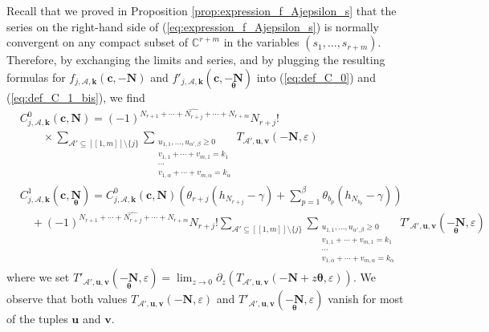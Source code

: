 \documentclass[a4paper]{amsart}
\theoremstyle{remark}
\theoremstyle{definition}
\begin{document}
Recall that we proved in Proposition \ref{prop:expression_f_Ajepsilon_s} that the series on the right-hand side of (\ref{eq:expression_f_Ajepsilon_s}) is normally convergent on any compact subset of $\mathbb{C}^{r+m}$ in the variables $(s_1,\ldots,s_{r+m})$. Therefore, by exchanging the limits and series, and by plugging the resulting formulas for $f_{j,\mathcal{A},\mathbf{k}}(\mathbf{c},-\mathbf{N})$ and $f'_{j,\mathcal{A},\mathbf{k}}(\mathbf{c},\underset{\bm{\theta}}{-\mathbf{N}})$ into (\ref{eq:def_C_0}) and (\ref{eq:def_C_1_bis}), we find
\begin{align}
    &C^0_{j,\mathcal{A},\mathbf{k}}(\mathbf{c},\mathbf{N}) = (-1)^{N_{r+1}+\cdots+\widehat{N_{r+j}}+\cdots+N_{r+m}}N_{r+j}! \label{eq:expression_C_0_series} \\
    & \qquad \times \sum_{\mathcal{A}' \subseteq [\![ 1,m ]\!] \setminus \{ j \}} \sum_{\substack{ u_{1,1},\ldots,u_{\alpha',\beta} \geq 0 \\ v_{1,1}+\cdots+v_{m,1}=k_1 \\ \cdots \\ v_{1,\alpha}+\cdots+v_{m,\alpha}=k_{\alpha}}} T_{\mathcal{A}',\mathbf{u},\mathbf{v}}(-\mathbf{N},\varepsilon) \nonumber \\
    &C^1_{j,\mathcal{A},\mathbf{k}}(\mathbf{c},\underset{\bm{\theta}}{\mathbf{N}}) = C^0_{j,\mathcal{A},\mathbf{k}}(\mathbf{c},\mathbf{N})\left( \theta_{r+j} (h_{N_{r+j}}-\gamma) + \sum_{p=1}^{\beta} \theta_{b_{p}}(h_{N_{b_p}}-\gamma)\right) \label{eq:expression_C_1_series} \\
     & \quad + (-1)^{N_{r+1}+\cdots+\widehat{N_{r+j}}+\cdots+N_{r+m}} N_{r+j}! \sum_{\mathcal{A}' \subseteq [\![ 1,m ]\!] \setminus \{ j \}} \sum_{\substack{ u_{1,1},\ldots,u_{\alpha',\beta} \geq 0 \\ v_{1,1}+\cdots+v_{m,1}=k_1 \\ \cdots \\ v_{1,\alpha}+\cdots+v_{m,\alpha}=k_{\alpha}}} T'_{\mathcal{A}',\mathbf{u},\mathbf{v}}(\underset{\bm{\theta}}{-\mathbf{N}},\varepsilon) \nonumber
\end{align}
where we set $T'_{\mathcal{A}',\mathbf{u},\mathbf{v}}(\underset{\bm{\theta}}{-\mathbf{N}},\varepsilon) = \lim_{z \to 0} \partial_z (T_{\mathcal{A}',\mathbf{u},\mathbf{v}}(-\mathbf{N}+z \bm{\theta},\varepsilon))$. We observe that both values $T_{\mathcal{A}',\mathbf{u},\mathbf{v}}(-\mathbf{N},\varepsilon)$ and $T'_{\mathcal{A}',\mathbf{u},\mathbf{v}}(\underset{\bm{\theta}}{-\mathbf{N}},\varepsilon)$ vanish for most of the tuples $\mathbf{u}$ and $\mathbf{v}$.
\end{document}
